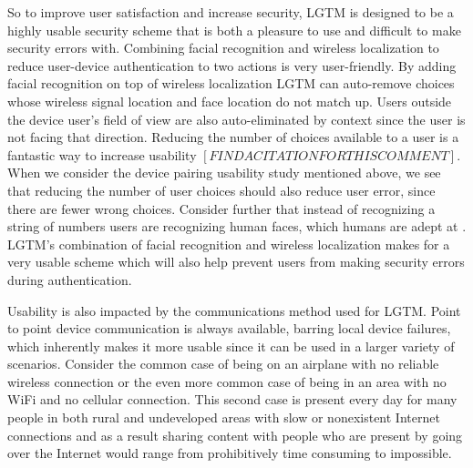 \documentclass[12pt]{report}
\begin{document}
So to improve user satisfaction and increase security, LGTM is designed to be a highly usable security scheme that is both a pleasure to use and difficult to make security errors with. Combining facial recognition and wireless localization to reduce user-device authentication to two actions is very user-friendly. By adding facial recognition on top of wireless localization LGTM can auto-remove choices whose wireless signal location and face location do not match up. Users outside the device user's field of view are also auto-eliminated by context since the user is not facing that direction. Reducing the number of choices available to a user is a fantastic way to increase usability $[FIND A CITATION FOR THIS COMMENT]$. When we consider the device pairing usability study mentioned above, we see that reducing the number of user choices should also reduce user error, since there are fewer wrong choices. Consider further that instead of recognizing a string of numbers users are recognizing human faces, which humans are adept at \cite{NewbornsFaceRecognitionTurati2006}. LGTM's combination of facial recognition and wireless localization makes for a very usable scheme which will also help prevent users from making security errors during authentication. \par

Usability is also impacted by the communications method used for LGTM. Point to point device communication is always available, barring local device failures, which inherently makes it more usable since it can be used in a larger variety of scenarios. Consider the common case of being on an airplane with no reliable wireless connection or the even more common case of being in an area with no WiFi and no cellular connection. This second case is present every day for many people in both rural and undeveloped areas with slow or nonexistent Internet connections and as a result sharing content with people who are present by going over the Internet would range from prohibitively time consuming to impossible. \par

\end{document}
